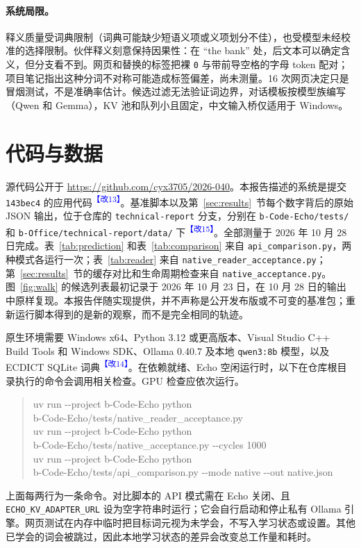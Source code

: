 \documentclass[11pt,a4paper,fontset=windows]{ctexart}
\newcommand{\code}[1]{\texttt{#1}}
\newcommand{\audit}[1]{\textcolor{blue}{\textsuperscript{【改#1】}}}
\begin{document}
\paragraph{系统局限。}释义质量受词典限制（词典可能缺少短语义项或义项划分不佳），也受模型未经校准的选择限制。伙伴释义刻意保持因果性：在 ``the bank'' 处，后文本可以确定含义，但分支看不到。网页和替换的标签把裸 \code{0} 与带前导空格的字母 token 配对；项目笔记指出这种分词不对称可能造成标签偏差，尚未测量。16 次网页决定只是冒烟测试，不是准确率估计。候选过滤无法验证词边界，对话模板按模型族编写（Qwen 和 Gemma），KV 池和队列小且固定，中文输入桥仅适用于 Windows。

\section{代码与数据}
\label{sec:reproduction}
源代码公开于 \url{https://github.com/cyx3705/2026-040}。本报告描述的系统是提交 \code{143bec4} 的应用代码\audit{13}。基准脚本以及第~\ref{sec:results}~节每个数字背后的原始 JSON 输出，位于仓库的 \code{technical-report} 分支，分别在 \code{b-Code-Echo/tests/} 和 \code{b-Office/technical-report/data/} 下\audit{15}。全部测量于 2026 年 10 月 28 日完成。表~\ref{tab:prediction} 和表~\ref{tab:comparison} 来自 \code{api\_comparison.py}，两种模式各运行一次；表~\ref{tab:reader} 来自 \code{native\_reader\_acceptance.py}；第~\ref{sec:results}~节的缓存对比和生命周期检查来自 \code{native\_acceptance.py}。图~\ref{fig:walk} 的候选列表最初记录于 2026 年 10 月 23 日，在 10 月 28 日的输出中原样复现。本报告伴随实现提供，并不声称是公开发布版或不可变的基准包；重新运行脚本得到的是新的观察，而不是完全相同的轨迹。

原生环境需要 Windows x64、Python 3.12 或更高版本、Visual Studio C++ Build Tools 和 Windows SDK、Ollama 0.40.7 及本地 \code{qwen3:8b} 模型，以及 ECDICT SQLite 词典\audit{14}。在依赖就绪、Echo 空闲运行时，以下在仓库根目录执行的命令会调用相关检查。GPU 检查应依次运行。
\begin{quote}\footnotesize\ttfamily
uv run -{}-project b-Code-Echo python\\
\hspace*{1em}b-Code-Echo/tests/native\_reader\_acceptance.py\\[3pt]
uv run -{}-project b-Code-Echo python\\
\hspace*{1em}b-Code-Echo/tests/native\_acceptance.py -{}-cycles 1000\\[3pt]
uv run -{}-project b-Code-Echo python\\
\hspace*{1em}b-Code-Echo/tests/api\_comparison.py -{}-mode native -{}-out native.json
\end{quote}
上面每两行为一条命令。对比脚本的 API 模式需在 Echo 关闭、且 \code{ECHO\_KV\_ADAPTER\_URL} 设为空字符串时运行；它会自行启动和停止私有 Ollama 引擎。网页测试在内存中临时把目标词元视为未学会，不写入学习状态或设置。其他已学会的词会被跳过，因此本地学习状态的差异会改变总工作量和耗时。
\end{document}
